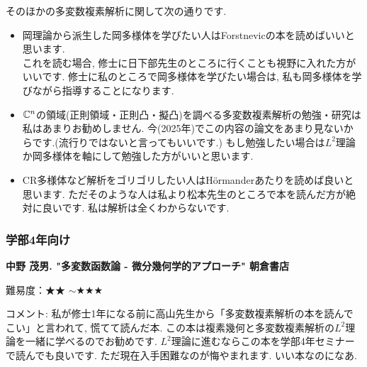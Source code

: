 そのほかの多変数複素解析に関して次の通りです. 
\vspace{-8pt}
\begin{tcolorbox}[mybox]
\begin{itemize}[left=0pt]
  \setlength{\parskip}{0cm} %
  \setlength{\itemsep}{5pt} %
\item 岡理論から派生した岡多様体を学びたい人はForstnevicの本を読めばいいと思います.  \\ これを読む場合, 修士に日下部先生のところに行くことも視野に入れた方がいいです. 修士に私のところで岡多様体を学びたい場合は, 私も岡多様体を学びながら指導することになります. 
\item $\mathbb{C}^n$の領域(正則領域・正則凸・擬凸)を調べる多変数複素解析の勉強・研究は私はあまりお勧めしません. 今(2025年)でこの内容の論文をあまり見ないからです.(流行りではないと言ってもいいです.) もし勉強したい場合は$L^2$理論か岡多様体を軸にして勉強した方がいいと思います. 
\item CR多様体など解析をゴリゴリしたい人はH\"ormanderあたりを読めば良いと思います. ただそのような人は私より松本先生のところで本を読んだ方が絶対に良いです. 私は解析は全くわからないです. 
\end{itemize}
\end{tcolorbox}




\subsubsection{学部4年向け}

\textbf{中野 茂男. "多変数函数論 - 微分幾何学的アプローチ" 朝倉書店}  　\vspace{-6pt} 

難易度：★★ $\sim$★★★ 　\vspace{-6pt} 

コメント: 私が修士1年になる前に高山先生から「多変数複素解析の本を読んでこい」と言われて, 慌てて読んだ本. この本は複素幾何と多変数複素解析の$L^2$理論を一緒に学べるのでお勧めです. $L^2$理論に進むならこの本を学部4年セミナーで読んでも良いです. ただ現在入手困難なのが悔やまれます. いい本なのになあ. 

\vspace{8pt}

